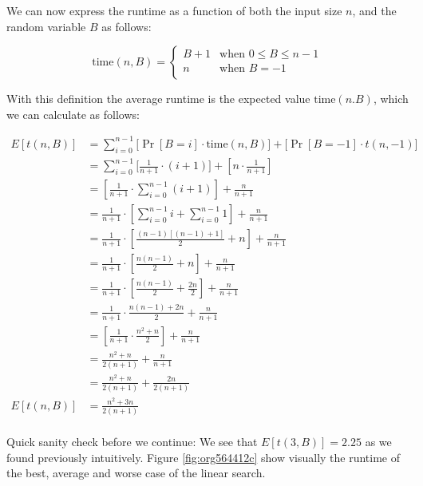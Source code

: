 \documentclass[11pt]{article}
\begin{document}
We can now express the runtime as a function of both the input
size \(n\), and the random variable \(B\) as follows:

\[
  \text{time}(n,B) = \begin{cases}
      B+1 &  \text{when } 0 \leq B \leq n-1 \\
      n &  \text{when } B={-1} \\
      \end{cases}
  \]

With this definition the average runtime is the expected value
\(\text{time}(n. B)\), which we can calculate as follows:

\begin{align*}
  E[t(n,B)] & = \sum_{i=0}^{n-1}{ \big[\Pr[B\!=\!i] \cdot \text{time}(n,B) \big]} + \big[ \Pr[B\!=\!{-1}] \cdot t(n,-1) \big] \\
            & = \sum_{i=0}^{n-1}{ \big[ \frac{1}{n+1} \cdot (i+1) \big]}+ \left[ n \cdot \frac{1}{n+1} \right] \\
            & = \left[ \frac{1}{n+1} \cdot \sum_{i=0}^{n-1}{(i+1)} \right] + \frac{n}{n+1} \\
            & = \frac{1}{n+1} \cdot \left[ \sum_{i=0}^{n-1}{i} + \sum_{i=0}^{n-1} 1 \right] + \frac{n}{n+1} \\
            & = \frac{1}{n+1} \cdot \left[ \frac{(n-1)[(n-1)+1]}{2} + n \right] + \frac{n}{n+1} \\
            & = \frac{1}{n+1} \cdot \left[ \frac{n(n-1)}{2} + n \right] + \frac{n}{n+1} \\
            & = \frac{1}{n+1} \cdot \left[ \frac{n(n-1)}{2} + \frac{2n}{2} \right] + \frac{n}{n+1} \\
            & = \frac{1}{n+1} \cdot \frac{n(n-1) + 2n}{2} + \frac{n}{n+1} \\
            & = \left[ \frac{1}{n+1} \cdot \frac{n^2+n}{2} \right] + \frac{n}{n+1} \\
            & = \frac{n^2+n}{2(n+1)} + \frac{n}{n+1} \\
            & = \frac{n^2+n}{2(n+1)} + \frac{2n}{2(n+1)} \\
  E[t(n,B)] & = \frac{n^2 + 3n}{2(n+1)} \\
\end{align*}

Quick sanity check before we continue: We see that \(E[t(3,B)] =
  2.25\) as we found previously intuitively. Figure \ref{fig:org564412c}
show visually the runtime of the best, average and worse case of
the linear search.
\end{document}
